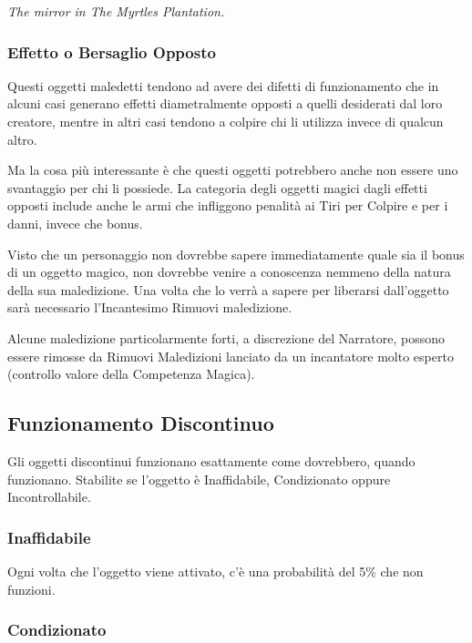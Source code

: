 \begin{multicols}{2}
\begin{center}
		\textit{The mirror in The Myrtles Plantation.}
	\end{center}

	\subsubsection{Effetto o Bersaglio Opposto}

	Questi oggetti maledetti tendono ad avere dei difetti di funzionamento che in alcuni casi generano effetti diametralmente opposti a quelli desiderati dal loro creatore, mentre in altri casi tendono a colpire chi li utilizza invece di qualcun altro.

	Ma la cosa più interessante è che questi oggetti potrebbero anche non essere uno svantaggio per chi li possiede. La categoria degli oggetti magici dagli effetti opposti include anche le armi che infliggono penalità ai Tiri per Colpire e per i danni, invece che bonus.

	Visto che un personaggio non dovrebbe sapere immediatamente quale sia il bonus di un oggetto magico, non dovrebbe venire a conoscenza nemmeno della natura della sua maledizione. Una volta che lo verrà a sapere per liberarsi dall'oggetto sarà necessario l'Incantesimo Rimuovi maledizione.

	Alcune maledizione particolarmente forti, a discrezione del Narratore, possono essere rimosse da Rimuovi Maledizioni lanciato da un incantatore molto esperto (controllo valore della Competenza Magica).

	\subsection{Funzionamento Discontinuo}

	Gli oggetti discontinui funzionano esattamente come dovrebbero, quando funzionano. Stabilite se l'oggetto è Inaffidabile, Condizionato oppure Incontrollabile.

	\medskip
	\subsubsection{Inaffidabile}

	Ogni volta che l'oggetto viene attivato, c'è una probabilità del 5\% che non funzioni.

	\subsubsection{Condizionato}


\end{multicols}
